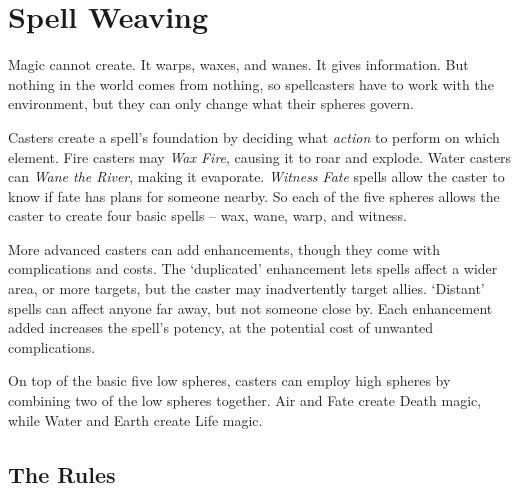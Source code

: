\chapter{Spell Weaving}

Magic cannot create.
It warps, waxes, and wanes.
It gives information.
But nothing in the world comes from nothing, so spellcasters have to work with the environment, but they can only change what their spheres govern.

Casters create a spell's foundation by deciding what \emph{action} to perform on which element.
Fire casters may \textit{Wax Fire}, causing it to roar and explode.
Water casters can \textit{Wane the River}, making it evaporate.
\textit{Witness Fate} spells allow the caster to know if fate has plans for someone nearby.
So each of the five spheres allows the caster to create four basic spells -- wax, wane, warp, and witness.

More advanced casters can add enhancements, though they come with complications and costs.
The `duplicated' enhancement lets spells affect a wider area, or more targets, but the caster may inadvertently target allies.
`Distant' spells can affect anyone far away, but not someone close by.
Each enhancement added increases the spell's potency, at the potential cost of unwanted complications.

On top of the basic five low spheres, casters can employ high spheres by combining two of the low spheres together.
Air and Fate create Death magic, while Water and Earth create Life magic.

\section{The Rules}

